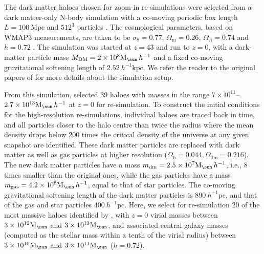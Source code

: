 \documentclass[fleqn,usenatbib]{mnras}
\newcommand{\Msun}{\hbox{M$_\sun$}}
\begin{document}
The dark matter haloes chosen for zoom-in re-simulations were selected
from  a dark matter-only N-body simulation with a co-moving periodic
box length $L=100\ \mathrm{Mpc}$ and $512^3$ particles
\citep{Moster10}. The  cosmological parameters, based on WMAP3
measurements, are taken to be $\sigma_8 = 0.77$,
$\Omega_{\mathrm{m}}=0.26$, $\Omega_{\Lambda}=0.74$ and $h= 0.72$
\citep[see, e.g.,][]{Spergel03}.
The simulation was started at $z=43$ and run to $z=0$, with a
dark-matter  particle mass $M_{\mathrm{DM}} = 2 \times 10^8
\Msun\,h^{-1}$ and a fixed co-moving gravitational softening length of
$2.52\ h^{-1} \mathrm{kpc}$. We refer the reader to the original
papers of \citet{Oser10, Oser12} for more details about the simulation
setup.  

From this simulation, \citet{Oser10} selected 39 haloes with masses in
the range  $7\times10^{11}$--$2.7\times10^{13}\Msun\,h^{-1}$ at $z=0$
for re-simulation. To construct the initial conditions for the
high-resolution re-simulations, individual haloes are traced back in
time, and all particles closer to the halo centre than twice  the
radius where the mean density drops below 200 times the critical
density of the universe at any given snapshot are identified. These
dark matter particles  are replaced with dark matter as well as gas
particles at higher resolution ($\Omega_{\mathrm{b}}=0.044,
\Omega_{\mathrm{dm}}=0.216$). The new dark  matter particles have a
mass $m_{\mathrm{dm}} = 2.5\times 10^7 \Msun\,h^{-1}$, i.e., 8 times
smaller than the original ones, while the gas particles have a mass
$m_{\mathrm{gas}} = 4.2\times 10^6\Msun\,h^{-1}$, equal to that  of
star particles. The co-moving gravitational softening length of the
dark matter particles is $890\ h^{-1}\mathrm{pc}$, and that of the gas
and star  particles $400\ h^{-1} \mathrm{pc}$.  Here, we select for
re-simulation 20 of the  most massive haloes identified by
\citet{Oser10}, with $z=0$ virial masses between  $3\times 10^{12}
\Msun$ and $3 \times 10^{13} \Msun$, and associated central  galaxy
masses (computed as the stellar mass within a tenth of the virial
radius)  between $3 \times 10^{10} \Msun$ and $3 \times 10^{11} \Msun$
($h=0.72$). 
\end{document}
